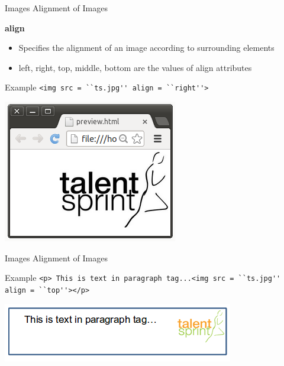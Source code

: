 \documentclass[14pt]{beamer}
\begin{document}
\begin{frame}{Images}
 Alignment of Images
 
 \vspace{1pc}
 \textbf{align}
 \begin{itemize}
  \item Specifies the alignment of an image according to surrounding elements
  \item left, right, top, middle, bottom are the values of align attributes
 \end{itemize}
\begin{minipage}{5cm}
 \begin{block}{Example}
 \lstinline!<img src = ``ts.jpg'' align = ``right''>!
 \end{block}
\end{minipage}
\begin{minipage}{5cm}
 \includegraphics[scale=.5]{image-demo.png}
\end{minipage}
\end{frame}

\begin{frame}{Images}
 Alignment of Images
 \begin{block}{Example}
  \lstinline!<p> This is text in paragraph tag...<img src = ``ts.jpg'' align = ``top''></p>!
 \end{block}
 \includegraphics[scale=.5]{text-image-right.png}
\end{frame}
\end{document}
